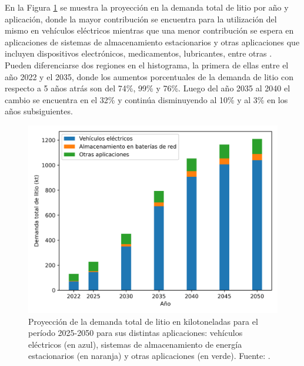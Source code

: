 En la Figura \ref{fig:iea-Li} se muestra la proyección en la demanda total de 
litio por año y aplicación, donde la mayor contribución se encuentra para la 
utilización del mismo en vehículos eléctricos mientras que una menor contribución 
se espera en aplicaciones de sistemas de almacenamiento estacionarios y otras 
aplicaciones que incluyen dispositivos electrónicos, medicamentos, lubricantes, 
entre otras \cite{IEA}. Pueden diferenciarse dos regiones en el histograma, la 
primera de ellas entre el año 2022 y el 2035, donde los aumentos porcentuales de 
la demanda de litio con respecto a 5 años atrás son del 74\%, 99\% y 76\%. Luego
del año 2035 al 2040 el cambio se encuentra en el 32\% y continúa disminuyendo 
al 10\% y al 3\% en los años subsiguientes.
\begin{figure}[h!]
    \centering
    \includegraphics[width=.8\textwidth]{Introduccion/energia/iea-Li.png}
    \caption{Proyección de la demanda total de litio en kilotoneladas para el 
    período 2025-2050 para sus distintas aplicaciones: vehículos eléctricos (en 
    azul), sistemas de almacenamiento de energía estacionarios (en naranja) y
    otras aplicaciones (en verde). Fuente: \cite{IEA}.}
    \label{fig:iea-Li}
\end{figure}

